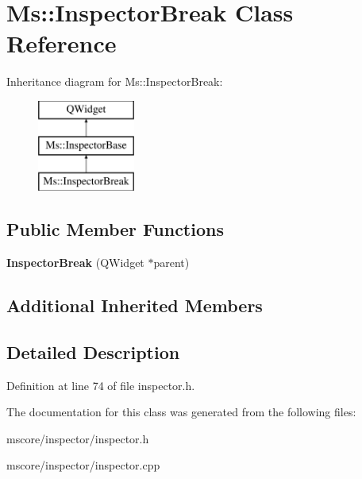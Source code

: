 \hypertarget{class_ms_1_1_inspector_break}{}\section{Ms\+:\+:Inspector\+Break Class Reference}
\label{class_ms_1_1_inspector_break}
Inheritance diagram for Ms\+:\+:Inspector\+Break\+:\begin{figure}[H]
\begin{center}
\leavevmode
\includegraphics[height=3.000000cm]{class_ms_1_1_inspector_break}
\end{center}
\end{figure}
\subsection*{Public Member Functions}
\begin{DoxyCompactItemize}
\item 
\mbox{\label{class_ms_1_1_inspector_break_a61c1a8d1eb050b8a949097568dda9acf}} 
{\bfseries Inspector\+Break} (Q\+Widget $\ast$parent)
\end{DoxyCompactItemize}
\subsection*{Additional Inherited Members}


\subsection{Detailed Description}


Definition at line 74 of file inspector.\+h.



The documentation for this class was generated from the following files\+:\begin{DoxyCompactItemize}
\item 
mscore/inspector/inspector.\+h\item 
mscore/inspector/inspector.\+cpp\end{DoxyCompactItemize}
